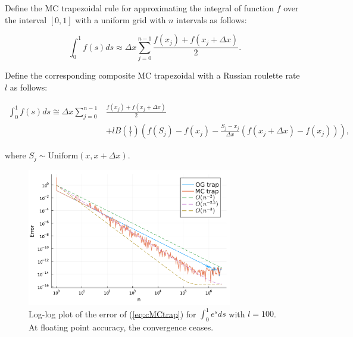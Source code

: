 \documentclass[a4paper,12pt]{article}
\begin{document}
\begin{definition} \label{MCtrap}
  Define the MC trapezoidal rule for approximating the integral
  of function $f$ over the interval $[0, 1]$ with a uniform grid
  with $n$ intervals as follows:

  \begin{equation}
    \int_{0}^{1} f(s) ds \approx \Delta x \sum_{j=0}^{n-1}  \frac{f(x_{j}) + f(x_{j}+\Delta x)}{2} .
  \end{equation}

  Define the  corresponding composite MC trapezoidal
  with a Russian roulette rate $l$ as follows:

  \begin{align} \label{eq:cMCtrap}
    \int_{0}^{1} f(s) ds \cong \Delta x \sum_{j=0}^{n-1} & \frac{f(x_{j}) + f(x_{j}+\Delta x)}{2} \nonumber \\
                                                         & + l B\left(\frac{1}{l}\right)
    \left(f(S_j) - f(x_{j}) - \frac{S_j - x_{j}}{\Delta x}(f(x_{j}+\Delta x) - f(x_{j}))\right),
  \end{align}


  where $S_j \sim \text{Uniform}(x,x+\Delta x)$.

\end{definition}

\begin{figure}[h!]
  \centering
  \includegraphics[width=0.8\textwidth]{julia_plots/trap_example.pdf}
  \caption{Log-log plot of the error of (\ref{eq:cMCtrap}) for
  $\int_{0}^{1}e^{s}ds$ with $l=100$. At floating point accuracy,
  the convergence ceases.
  }
  \label{fig:MCtrap}
\end{figure}
\end{document}
